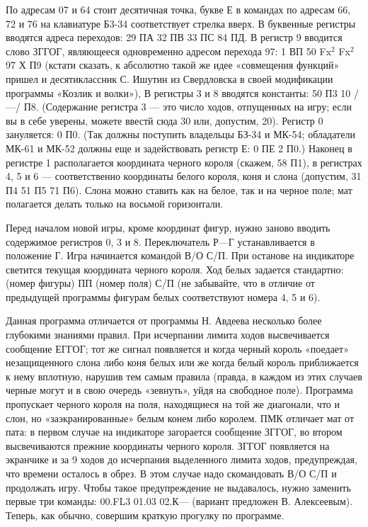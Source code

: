 \documentclass[11pt,a4paper,oneside]{article}
\begin{document}
По адресам 07 и 64 стоит десятичная точка, букве Е в командах по адресам 66, 72 и 76 на клавиатуре Б3-34 соответствует стрелка вверх. В буквенные регистры вводятся адреса переходов: 29 ПА 32 ПВ 33 ПС 84 ПД. В регистр 9 вводится слово ЗГГОГ, являющееся одновременно адресом перехода 97: 1 ВП 50 Fx$^{2}$ Fx$^{2}$ 97 Х П9 (кстати сказать, к абсолютно такой же идее «совмещения функций» пришел и десятиклассник С. Ишутин из Свердловска в своей модификации программы «Козлик и волки»), В регистры 3 и 8 вводятся константы: 50 П3 10 /—/ П8. (Содержание регистра 3 — это число ходов, отпущенных на игру; если вы в себе уверены, можете ввестй сюда 30 или, допустим, 20). Регистр 0 зануляется: 0 П0. (Так должны поступить владельцы БЗ-34 и МК-54; обладатели МК-61 и МК-52 должны еще и задействовать регистр Е: 0 ПЕ 2 П0.) Наконец в регистре 1 располагается координата черного короля (скажем, 58 П1), в регистрах 4, 5 и 6 — соответственно координаты белого короля, коня и слона (допустим, 31 П4 51 П5 71 П6). Слона можно ставить как на белое, так и на черное поле; мат полагается делать только на восьмой горизонтали.

Перед началом новой игры, кроме координат фигур, нужно заново вводить содержимое регистров 0, 3 и 8. Переключатель Р—Г устанавливается в положение Г. Игра начинается командой В/О С/П. При останове на индикаторе светится текущая координата черного короля. Ход белых задается стандартно: (номер фигуры) ПП (номер поля) С/П (не забывайте, что в отличие от предыдущей программы фигурам белых соответствуют номера 4, 5 и 6).

Данная программа отличается от программы Н. Авдеева несколько более глубокими знаниями правил. При исчерпании лимита ходов высвечивается сообщение ЕГГОГ; тот же сигнал появляется и когда черный король «поедает» незащищенного слона либо коня белых или же когда белый король приближается к нему вплотную, нарушив тем самым правила (правда, в каждом из этих случаев черные могут и в свою очередь «зевнуть», уйдя на свободное поле). Программа пропускает черного короля на поля, находящиеся на той же диагонали, что и слон, но «заэкранированные» белым конем либо королем. ПМК отличает мат от пата: в первом случае на индикаторе загорается сообщение ЗГГОГ, во втором высвечиваются прежние координаты черного короля. ЗГГОГ появляется на экранчике и за 9 ходов до исчерпания выделенного лимита ходов, предупреждая, что времени осталось в обрез. В этом случае надо скомандовать В/О С/П и продолжать игру. Чтобы такое предупреждение не выдавалось, нужно заменить первые три команды: 00.FL3 01.03 02.К— (вариант предложен В. Алексеевым). Теперь, как обычно, совершим краткую прогулку по программе.
\end{document}
